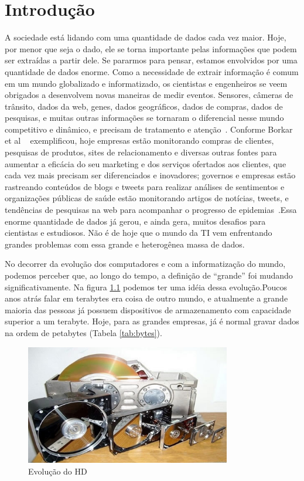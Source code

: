 \chapter{Introdução}
A sociedade está lidando com uma quantidade de dados cada vez maior. Hoje, por menor que seja o dado, ele se torna importante pelas informações que podem ser extraídas a partir dele. Se pararmos para pensar, estamos envolvidos por uma quantidade de dados enorme. Como a necessidade de extrair informação é comum em um mundo globalizado e informatizado,  os cientistas e engenheiros se veem obrigados a desenvolvem novas maneiras de medir eventos. Sensores, câmeras de trânsito, dados da web, genes, dados geográficos, dados de compras, dados de pesquisas, e muitas outras informações se tornaram o diferencial nesse mundo competitivo e dinâmico, e precisam de tratamento e atenção~\cite{initBigData}. Conforme Borkar et al ~\cite{WNextBigData} exemplificou, hoje empresas estão monitorando compras de clientes, pesquisas de produtos, sites de relacionamento e diversas outras fontes para aumentar a eficácia do seu marketing e dos serviços ofertados aos clientes, que cada vez mais precisam ser diferenciados e inovadores; governos e empresas estão rastreando conteúdos de blogs e tweets para realizar análises de sentimentos e organizações públicas de saúde estão monitorando artigos de notícias, tweets, e tendências de pesquisas na web para acompanhar o progresso de epidemias~\cite{WNextBigData}.Essa enorme quantidade de dados já gerou, e ainda gera, muitos desafios para cientistas e estudiosos. Não é de hoje que o mundo da TI vem enfrentando grandes problemas com essa grande e heterogênea massa de dados.

No decorrer da evolução dos computadores e com a informatização do mundo, podemos perceber que, ao longo do tempo, a definição de “grande” foi mudando significativamente. Na figura \ref{fig:hd} podemos ter uma idéia dessa evolução.Poucos anos atrás falar em terabytes era coisa de outro mundo, e atualmente a grande maioria das pessoas já possuem dispositivos de armazenamento com capacidade superior a um terabyte. Hoje, para as grandes empresas, já é normal gravar dados na ordem de petabytes (Tabela \ref{tab:bytes}).

	\begin{figure}[!htbp]
		\begin{center}
			\includegraphics[width=0.8\textwidth]{historiaDiscoRigido}
		\end{center}
		\caption{Evolução do HD ~\cite{hd}}
		\label{fig:hd}
	\end{figure}

